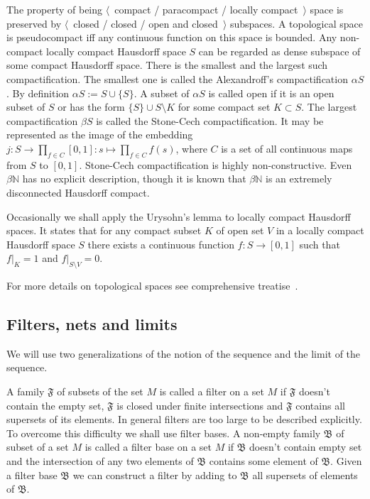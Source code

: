 The property of being $\langle$~compact / paracompact / locally
compact~$\rangle$ space is preserved by $\langle$~closed / closed / open and
closed~$\rangle$ subspaces. A topological space is pseudocompact iff any
continuous function on this space is bounded. Any non-compact locally compact
Hausdorff space $S$ can be regarded as dense subspace of some compact Hausdorff
space. There is the smallest and the largest such compactification. The smallest
one is called the Alexandroff's compactification $\alpha S$.  By definition
$\alpha S:=S\cup  \{S \}$. A subset of $\alpha S$ is called open if it is an
open subset of $S$ or has the form $ \{S \}\cup S\setminus K$ for some compact
set $K\subset S$. The largest compactification $\beta S$ is called the
Stone-Cech compactification. It may be represented as the image of the embedding
$j:S\to\prod_{f\in C}[0,1]:s\mapsto \prod_{f\in C}f(s)$, where $C$ is a set of
all continuous maps from $S$ to $[0,1]$. Stone-Cech compactification is highly
non-constructive. Even $\beta\mathbb{N}$ has no explicit description, though it
is known that $\beta\mathbb{N}$ is an extremely disconnected Hausdorff compact.

Occasionally we shall apply the Urysohn's lemma to locally compact Hausdorff
spaces. It states that for any compact subset $K$ of open set $V$ in a locally
compact Hausdorff space $S$ there exists a continuous function $f:S\to [0,1]$
such that $f|_K=1$ and $f|_{S\setminus V}=0$. 

For more details on topological spaces see comprehensive
treatise~\cite{EngelGenTop}. 


\subsection{
  Filters, nets and limits}\label{SubSectionFiltersNetsAndLimits} 

We will use two generalizations of the notion of the sequence and the limit of
the sequence.

A family $\mathfrak{F}$ of subsets of the set $M$ is called a filter on a set
$M$ if $\mathfrak{F}$ doesn't contain the empty set, $\mathfrak{F}$ is closed
under finite intersections and $\mathfrak{F}$ contains all supersets of its
elements. In general filters are too large to be described explicitly. To
overcome this difficulty we shall use filter bases. A non-empty family
$\mathfrak{B}$ of subset of a set $M$ is called a filter base on a set $M$ if
$\mathfrak{B}$ doesn't contain empty set and the intersection of any two
elements of $\mathfrak{B}$ contains some element of $\mathfrak{B}$. Given a
filter base $\mathfrak{B}$ we can construct a filter by adding to $\mathfrak{B}$
all supersets of elements of $\mathfrak{B}$.

